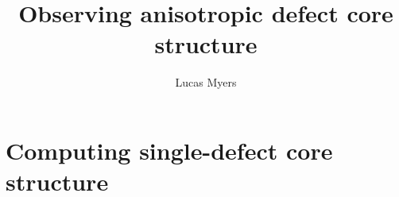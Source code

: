 \documentclass[reqno]{article}
\begin{document}
\title{Observing anisotropic defect core structure}
\author{Lucas Myers}
\maketitle

\section{Computing single-defect core structure}
\end{document}
